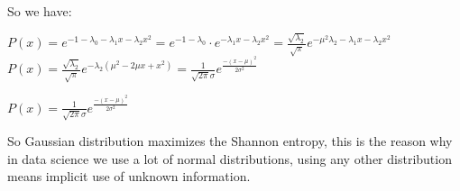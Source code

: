 \documentclass[paper=9in:6in,pagesize=pdftex,headinclude=on,footinclude=on,10pt,bibtotoc,pointlessnumbers,normalheadings,DIV=9,twoside=false]{scrbook}
\begin{document}
    \begin{text}
    So we have:\\
    \end{text}
    
    \begin{center}
 $P(x) = e^{-1-\lambda_0 - \lambda_1 x - \lambda_2 x^2}= e^{-1-\lambda_0} \cdot e^{-\lambda_1x - \lambda_2 x^2} = \frac{\sqrt{\lambda_2}}{\sqrt{\pi}} e^{-\mu^2\lambda_2 - \lambda_1 x - \lambda_2 x^2}$\\
 
 $P(x)= \frac{\sqrt{\lambda_2}}{\sqrt{\pi}} e^{-\lambda_2(\mu^2 -2\mu x + x^2)}= \frac{1}{\sqrt{2\pi}\sigma} e^{\frac{-(x-\mu)^2}{2\sigma^2}}$\\
 
 
 
 
    \end{center}
    
\begin{center}
 \large{$P(x)=\frac{1}{\sqrt{2\pi}\sigma}e^{\frac{-(x-\mu)^2}{2\sigma^2}}$ }\\

\end{center}

\begin{text}
So Gaussian distribution maximizes the Shannon entropy, this is the reason why in data science we use a lot of normal distributions, using any other distribution means implicit use of unknown information.
\end{text}
\end{document}
